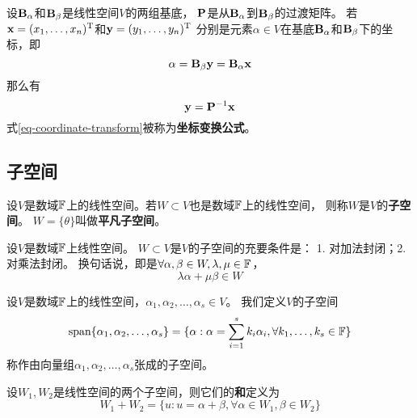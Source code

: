 \begin{theorem}[坐标变换公式]
  设$\mathbf{B}_{\alpha}$和$\mathbf{B}_{\beta}$是线性空间$V$的两组基底，
  $\mathbf{P}$是从$\mathbf{B}_{\alpha}$到$\mathbf{B}_{\beta}$的过渡矩阵。
  若$\mathbf{x}=(x_1,\dots,x_n)^{\textrm{T}}$和$\mathbf{y}=(y_1,\dots,y_n)^{\textrm{T}}$
  分别是元素$\alpha\in V$在基底$\mathbf{B}_{\alpha}$和$\mathbf{B}_{\beta}$下的坐标，即
  \[ \alpha = \mathbf{B}_{\beta}\mathbf{y} = \mathbf{B}_{\alpha}\mathbf{x} \]
  那么有
  \begin{equation} \label{eq-coordinate-transform}
    \mathbf{y} = \mathbf{P}^{-1}\mathbf{x}
  \end{equation}
  式\ref{eq-coordinate-transform}被称为\textbf{坐标变换公式}。
\end{theorem}

\subsection{子空间}
\begin{definition}
  设$V$是数域$\mathbb{F}$上的线性空间。若$W\subset V$也是数域$\mathbb{F}$上的线性空间，
  则称$W$是$V$的\textbf{子空间}。
  $W=\{\theta\}$叫做\textbf{平凡子空间}。
\end{definition}

\begin{theorem}[子空间的充要条件]
  设$V$是数域$\mathbb{F}$上线性空间。
  $W\subset V$是$V$的子空间的充要条件是：
  1. 对加法封闭；2. 对乘法封闭。
  换句话说，即是$\forall\alpha,\beta\in W,\lambda,\mu\in\mathbb{F}$，
  \[ \lambda\alpha + \mu\beta \in W \]
\end{theorem}

\begin{definition}[子集张成的子空间]
    设$V$是数域$\mathbb{F}$上的线性空间，$\alpha_1,\alpha_2,\dots,\alpha_s\in V$。
    我们定义$V$的子空间
    \begin{displaymath}
    \textrm{span}\{ \alpha_1,\alpha_2,\dots,\alpha_s \} =
    \{ \alpha: \alpha=\sum_{i=1}^{s}k_i\alpha_i, \forall k_1,\dots,k_s\in\mathbb{F} \}
    \end{displaymath}
    称作由向量组$\alpha_1,\alpha_2,\dots,\alpha_s$张成的子空间。
\end{definition}

\begin{definition}[线性空间的和]
  设$W_1,W_2$是线性空间的两个子空间，则它们的\textbf{和}定义为
  \begin{displaymath}
    W_1+W_2 = \{ u: u=\alpha+\beta, \forall\alpha\in W_1,\beta\in W_2 \}
  \end{displaymath}
\end{definition}

